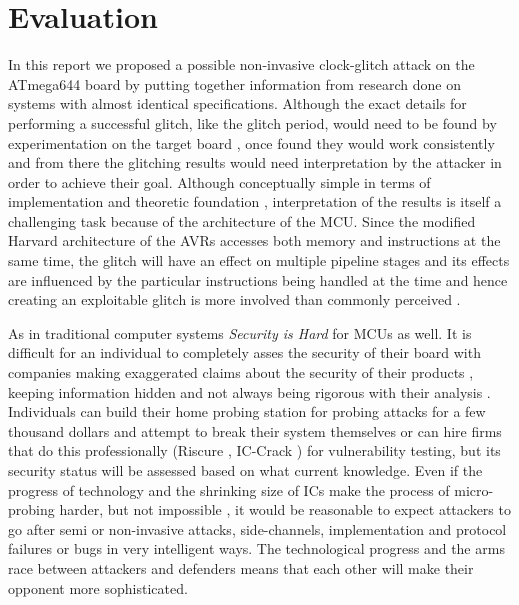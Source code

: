 \section{Evaluation}
\label{sec:conclusion}
In this report we proposed a possible non-invasive clock-glitch attack on the ATmega644 board by putting together information from research done on systems with almost identical specifications. Although the exact details for performing a successful glitch, like the glitch period, would need to be found by experimentation on the target board \citep{glitches_paper}, once found they would work consistently \citep{glitches_paper} and from there the glitching results would need interpretation by the attacker in order to achieve their goal. Although conceptually simple in terms of implementation and theoretic foundation \citep{sergei:thesis} \citep{glitches_paper}, interpretation of the results is itself a challenging task \citep{glitches_paper} because of the architecture of the MCU. Since the modified Harvard architecture of the AVRs accesses both memory and instructions at the same time, the glitch will have an effect on multiple pipeline stages and its effects are influenced by the particular instructions being handled at the time and hence creating an exploitable glitch is more involved than commonly perceived \citep{glitches_paper}. 

As in traditional computer systems \emph{Security is Hard} for MCUs as well. It is difficult for an individual to completely asses the security of their board with companies making exaggerated claims about the security of their products \citep{sergei:thesis}, keeping information hidden and not always being rigorous with their analysis \citep{sergei:thesis}. Individuals can build their home probing station for probing attacks for a few thousand dollars \citep{sergei:thesis} \citep{low_cost_probing} and attempt to break their system themselves or can hire firms that do this professionally (Riscure \citep{website:riscure}, {IC-Crack} \citep{atmel_mcu_crack}) for vulnerability testing, but its security status will be assessed based on what current knowledge. Even if the progress of technology and the shrinking size of ICs make the process of micro-probing harder, but not impossible \citep{sergei:thesis} \citep{gutman:memory_remanence}, it would be reasonable to expect attackers to go after semi or non-invasive attacks, side-channels, implementation and protocol failures or bugs in very intelligent ways. The technological progress and the arms race between attackers and defenders means that each other will make their opponent more sophisticated.

